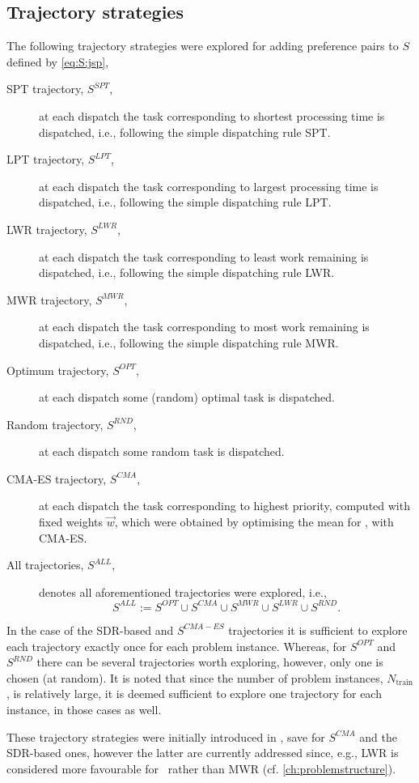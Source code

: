 \subsection{Trajectory strategies}
The following trajectory strategies were explored for adding preference pairs to $S$ defined by \cref{eq:S:jsp},
\begin{description}
\item[SPT trajectory, $S^{SPT}$,] at each dispatch the task corresponding to shortest processing time is dispatched, i.e., following the simple dispatching rule SPT.
\item[LPT trajectory, $S^{LPT}$,] at each dispatch the task corresponding to largest processing time is dispatched, i.e., following the simple dispatching rule LPT.
\item[LWR trajectory, $S^{LWR}$,] at each dispatch the task corresponding to least work remaining is dispatched, i.e., following the simple dispatching rule LWR.
\item[MWR trajectory, $S^{MWR}$,] at each dispatch the task corresponding to most work remaining is dispatched, i.e., following the simple dispatching rule MWR.
\item[Optimum trajectory, $S^{OPT}$,] at each dispatch some (random) optimal task is dispatched.
\item[Random trajectory, $S^{RND}$,] at each dispatch some random task is dispatched.
\item[CMA-ES trajectory, $S^{CMA}$,] at each dispatch the task corresponding to highest priority, computed with fixed weights $\vec{w}$, which were obtained by optimising the mean for \fullnamerho, with CMA-ES. 
\item[All trajectories, $S^{ALL}$,] denotes all aforementioned trajectories were explored, i.e., 
\begin{equation}
S^{ALL}:=S^{OPT}\cup S^{CMA}\cup S^{MWR}\cup S^{LWR} \cup S^{RND}.
\end{equation}
\end{description}
In the case of the SDR-based and $S^{CMA-ES}$ trajectories it is sufficient to explore each trajectory exactly once for each problem instance. Whereas, for $S^{OPT}$ and $S^{RND}$ there can be several trajectories worth exploring, however, only one is chosen (at random). It is noted that since the number of problem instances, $N_{\text{train}}$, is relatively large, it is deemed sufficient to explore one trajectory for each instance, in those cases as well.

These trajectory strategies were initially introduced in \citet{InRu14b}, save for $S^{CMA}$ and the SDR-based ones, however the latter are currently addressed since, e.g., LWR is considered more favourable for \fsp\ rather than MWR (cf. \cref{ch:problemstructure}). 

